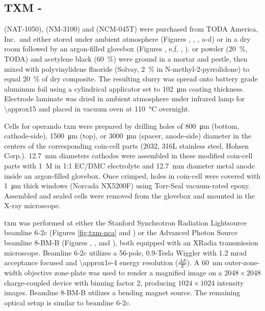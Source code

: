 \documentclass{article}
\begin{document}
\subsection*{TXM - \nmc{}}

\nca{} (NAT-1050), \nmc[333]{} (NM-3100) and \nmc[532]{} (NCM-045T)
were purchased from TODA America, Inc.\ and either stored under
ambient atmosphere (Figures ,
, ,
a-d) or in a dry room followed by an
argon-filled glovebox (Figures ,
e,f, ,
). \nca{} or \nmc{} powder
(\SI{20}{\percent}, TODA) and acetylene black (\SI{60}{\percent}) were
ground in a mortar and pestle, then mixed with polyvinylidene fluoride
(Solvay, \SI{2}{\percent} in N-methyl-2-pyrrolidone) to equal
\SI{20}{\percent} of dry composite. The resulting slurry was spread
onto battery grade aluminum foil using a cylindrical applicator set to
\SI{102}{\micro\meter} coating thickness. Electrode laminate was dried
in ambient atmosphere under infrared lamp for \SI{\approx15}{\min} and
placed in vacuum oven at \SI{110}{\celsius} overnight.

Cells for operando \gls{txm} were prepared by drilling holes of
\SI{800}{\micro\meter} (bottom, cathode-side), \SI{1500}{\micro\meter}
(top), or \SI{3000}{\micro\meter} (spacer, anode-side) diameter in the
centers of the corresponding coin-cell parts (2032, 316L stainless
steel, Hohsen Corp.). \SI{12.7}{\milli\meter} diameters cathodes were
assembled in these modified coin-cell parts with \SI{1}{M} 
in 1:1 EC/DMC electrolyte and \SI{12.7}{\milli\meter} diameter 
metal anode inside an argon-filled glovebox. Once crimped, holes in
coin-cell were covered with \SI{1}{\micro\meter} thick 
windows (Norcada NX5200F) using Torr-Seal vacuum-rated
epoxy. Assembled and sealed cells were removed from the glovebox and
mounted in the X-ray microscope.

\gls{txm} was performed at either the Stanford Synchrotron Radiation
Lightsource beamline 6-2c (Figures \ref{fig:txm-nca} and
) or the Advanced Photon Source beamline
8-BM-B (Figures ,
, and ),
both equipped with an XRadia transmission microscope. Beamline 6-2c
utilizes a 56-pole, 0.9-Tesla Wiggler with 1.2 mrad acceptance focused
and \num{\approx1e-4} energy resolution ($\frac{\Delta E}{E}$). A
\SI{60}{nm} outer-zone-width objective zone-plate was used to render a
magnified image on a $2048 \times 2048$ charge-coupled device with
binning factor 2, producing $1024 \times 1024$ intensity
images. Beamline 8-BM-B utilizes a bending magnet source. The
remaining optical setup is similar to beamline 6-2c.
\end{document}
